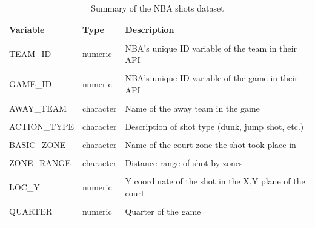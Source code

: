 \documentclass[
  12pt,
  a4paper,
]{article}
\begin{document}
\begin{table}[H]

\caption{\label{tab:shotsdesc}Summary of the NBA shots dataset}
\centering
\begin{tabular}[t]{lll}
\toprule
Variable & Type & Description\\
\midrule
\cellcolor{gray!30}{SEASON\_2} & \cellcolor{gray!30}{character} & \cellcolor{gray!30}{Season indicator}\\
TEAM\_ID & numeric & NBA's unique ID variable of the team in their API\\
\cellcolor{gray!30}{TEAM\_NAME} & \cellcolor{gray!30}{character} & \cellcolor{gray!30}{Name of the team taking the shot}\\
GAME\_ID & numeric & NBA's unique ID variable of the game in their API\\
\cellcolor{gray!30}{HOME\_TEAM} & \cellcolor{gray!30}{character} & \cellcolor{gray!30}{Name of the home team in the game}\\
AWAY\_TEAM & character & Name of the away team in the game\\
\cellcolor{gray!30}{SHOT\_MADE} & \cellcolor{gray!30}{logical} & \cellcolor{gray!30}{Logical variable denoting a shot outcome}\\
ACTION\_TYPE & character & Description of shot type (dunk, jump shot, etc.)\\
\cellcolor{gray!30}{SHOT\_TYPE} & \cellcolor{gray!30}{numeric} & \cellcolor{gray!30}{Type of shot (2 or 3-pointer)}\\
BASIC\_ZONE & character & Name of the court zone the shot took place in\\
\cellcolor{gray!30}{ZONE\_NAME} & \cellcolor{gray!30}{character} & \cellcolor{gray!30}{Name of the side of court the shot took place in}\\
ZONE\_RANGE & character & Distance range of shot by zones\\
\cellcolor{gray!30}{LOC\_X} & \cellcolor{gray!30}{numeric} & \cellcolor{gray!30}{X coordinate of the shot in the X,Y plane of the court}\\
LOC\_Y & numeric & Y coordinate of the shot in the X,Y plane of the court\\
\cellcolor{gray!30}{SHOT\_DISTANCE} & \cellcolor{gray!30}{numeric} & \cellcolor{gray!30}{Distance of the shot to the center of the hoop, in ft}\\
QUARTER & numeric & Quarter of the game\\
\cellcolor{gray!30}{TIME\_LEFT} & \cellcolor{gray!30}{character} & \cellcolor{gray!30}{Minutes and seconds remaining in the quarter}\\
\bottomrule
\end{tabular}
\end{table}
\end{document}
